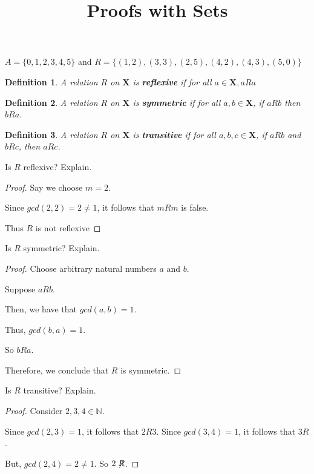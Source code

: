 \documentclass[12pt]{article}
\title{Proofs with Sets}
\date{}
\newtheorem{definition}{Definition}
\begin{document}
\maketitle

$A = \{0,1,2,3,4,5\}$ and $R = \{ (1,2), (3,3), (2,5), (4,2), (4,3), (5,0) \}$

\begin{definition}
    A relation $R$ on $\mathbf{X}$ is \textbf{reflexive} if for all $a \in \mathbf{X}, aRa$
\end{definition}
\begin{definition}
    A relation $R$ on $\mathbf{X}$ is \textbf{symmetric} if for all $a,b \in \mathbf{X}$, if $aRb$ then $bRa$.
\end{definition}
\begin{definition}
    A relation $R$ on $\mathbf{X}$ is \textbf{transitive} if for all $a,b,c \in \mathbf{X}$, if $aRb$ and $bRc$, then $aRc$.
\end{definition}


Is $R$ reflexive? Explain.
\begin{proof}
    Say we choose $m=2$.

    Since $gcd(2, 2) = 2 \neq 1$, it follows that $mRm$ is false.

    Thus $R$ is not reflexive
\end{proof}

Is $R$ symmetric? Explain.
\begin{proof}
    Choose arbitrary natural numbers $a$ and $b$.

    Suppose $aRb$.

    Then, we have that $gcd(a, b) = 1$.

    Thus, $gcd(b, a ) = 1$.

    So $bRa$.

    Therefore, we conclude that $R$ is symmetric.
\end{proof}

Is $R$ transitive? Explain.
\begin{proof}
    Consider $2,3,4 \in \mathbb{N}$.

    Since $gcd(2,3) = 1$, it follows that $2R3$.
    Since $gcd(3,4) = 1$, it follows that $3R$.

    But, $gcd(2,4) = 2 \neq 1$. So $2\not\mathrel{R}$.
\end{proof}
\end{document}
